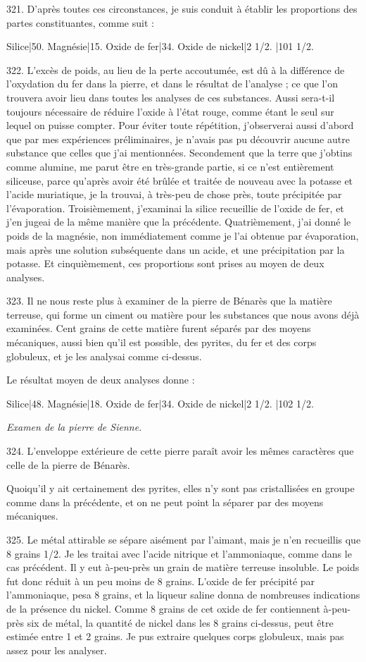 \documentclass[a4paper, 11pt, oneside, polutonikogreek, french]{article}
\begin{document}
321. D'après toutes ces circonstances, je suis conduit à établir les proportions des partes constituantes, comme suit :

Silice|50.
Magnésie|15.
Oxide de fer|34.
Oxide de nickel|2 1/2.
|101 1/2.

322. L'excès de poids, au lieu de la perte accoutumée, est dû à la différence de l'oxydation du fer dans la pierre, et dans le résultat de l'analyse ; ce que l'on trouvera avoir lieu dans toutes les analyses de ces substances. Aussi sera-t-il toujours nécessaire de réduire l'oxide à l'état rouge, comme étant le seul sur lequel on puisse compter. Pour éviter toute répétition, j'observerai aussi d'abord que par mes expériences préliminaires, je n'avais pas pu découvrir aucune autre substance que celles que j'ai mentionnées. Secondement que la terre que j'obtins comme alumine, me parut être en très-grande partie, si ce n'est entièrement siliceuse, parce qu'après avoir été brûlée et traitée de nouveau avec la potasse et l'acide muriatique, je la trouvai, à très-peu de chose près, toute précipitée par l'évaporation. Troisièmement, j'examinai la silice recueillie de l'oxide de fer, et j'en jugeai de la même manière que la précédente. Quatrièmement, j'ai donné le poids de la magnésie, non immédiatement comme je l'ai obtenue par évaporation, mais après une solution subséquente dans un acide, et une précipitation par la potasse. Et cinquièmement, ces proportions sont prises au moyen de deux analyses.

323. Il ne nous reste plus à examiner de la pierre de Bénarès que la matière terreuse, qui forme un ciment ou matière pour les substances que nous avons déjà examinées. Cent grains de cette matière furent séparés par des moyens mécaniques, aussi bien qu'il est possible, des pyrites, du fer et des corps globuleux, et je les analysai comme ci-dessus.

Le résultat moyen de deux analyses donne :

Silice|48.
Magnésie|18.
Oxide de fer|34.
Oxide de nickel|2 1/2.
|102 1/2.

\emph{Examen de la pierre de Sienne.}

324. L'enveloppe extérieure de cette pierre paraît avoir les mêmes caractères que celle de la pierre de Bénarès.

Quoiqu'il y ait certainement des pyrites, elles n'y sont pas cristallisées en groupe comme dans la précédente, et on ne peut point la séparer par des moyens mécaniques.

325. Le métal attirable se sépare aisément par l'aimant, mais je n'en recueillis que 8 grains 1/2. Je les traitai avec l'acide nitrique et l'ammoniaque, comme dans le cas précédent. Il y eut à-peu-près un grain de matière terreuse insoluble. Le poids fut donc réduit à un peu moins de 8 grains. L'oxide de fer précipité par l'ammoniaque, pesa 8 grains, et la liqueur saline donna de nombreuses indications de la présence du nickel. Comme 8 grains de cet oxide de fer contiennent à-peu-près six de métal, la quantité de nickel dans les 8 grains ci-dessus, peut être estimée entre 1 et 2 grains. Je pus extraire quelques corps globuleux, mais pas assez pour les analyser.
\end{document}
